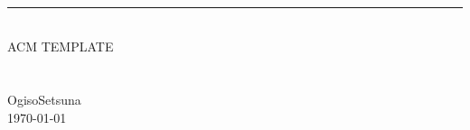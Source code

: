 \begin{titlepage}
	\pagestyle{empty}
	
  \begin{center}
		~\\[80pt]
    \hrule\ \\[8pt]
    \fontsize{48pt}{\baselineskip}\selectfont  \textsc{ACM  TEMPLATE}\\[8pt]
    ~\\[20pt]
    ~\\[20pt]
    \huge{OgisoSetsuna}\\[8pt]
    \Large \today
  \end{center}
\end{titlepage}
\restoregeometry